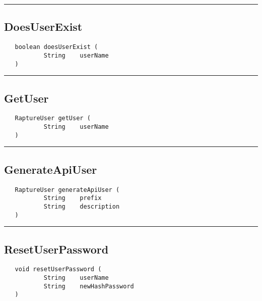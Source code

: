 \rule{15cm}{2pt}
\subsection{DoesUserExist}
\label{Api:DoesUserExist}
\begin{verbatim}
   boolean doesUserExist (
           String    userName
   )
\end{verbatim}



\rule{15cm}{2pt}
\subsection{GetUser}
\label{Api:GetUser}
\begin{verbatim}
   RaptureUser getUser (
           String    userName
   )
\end{verbatim}



\rule{15cm}{2pt}
\subsection{GenerateApiUser}
\label{Api:GenerateApiUser}
\begin{verbatim}
   RaptureUser generateApiUser (
           String    prefix
           String    description
   )
\end{verbatim}



\rule{15cm}{2pt}
\subsection{ResetUserPassword}
\label{Api:ResetUserPassword}
\begin{verbatim}
   void resetUserPassword (
           String    userName
           String    newHashPassword
   )
\end{verbatim}



